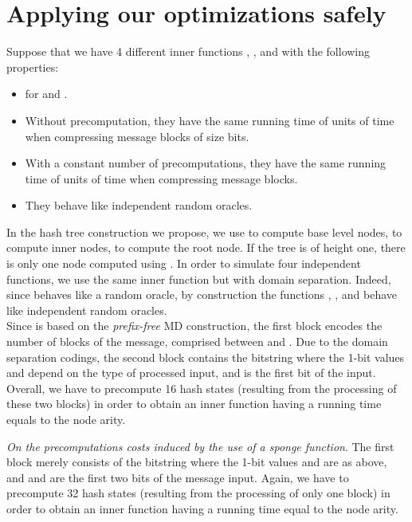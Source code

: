 \documentclass{llncs}
\renewcommand{\paragraph}[1]{\noindent\textit{#1}.}
\begin{document}
\section{Applying our optimizations safely}\label{sec_section2}

Suppose that we have 4 different inner functions , ,  and  with the following properties:
\begin{itemize}
 \item  for  and    .
 \item Without precomputation, they have the same running time of  units of
time when compressing  message blocks of size  bits.
  \item With a constant number of precomputations, they have the same running time of  units of time when
  compressing  message blocks.
\item They behave like independent random oracles.
\end{itemize}
In the hash tree construction we propose, we use  to compute base level nodes,  to compute inner nodes, 
to compute the root node. If the tree is of height one, there is only one node computed using . In order
to simulate four independent functions, we use the same inner function  but with domain separation. Indeed, since  behaves like a random oracle,
by construction the functions , ,  and  
behave like independent random oracles.
~\\

Since  is based on the \emph{prefix-free} MD construction, the first block encodes the number of blocks of the message, comprised between  and . 
Due to the domain separation codings,
the second block contains the bitstring  where the 1-bit values  and  depend on the type of processed input, 
and  is the first bit of the input. Overall, we have to precompute 16 hash states (resulting from the processing of these two blocks) in order to
obtain an inner function having a running time equals to the node arity.

\paragraph{On the precomputations costs induced by the use of a sponge function}
The first block merely consists of the bitstring  where the 1-bit values  and  are as above,
and  and  are the first two bits of the message input. Again, we have to precompute 32 hash states (resulting from the processing of only one block) 
in order to obtain an inner function having a running time equal to the node arity.
\end{document}
